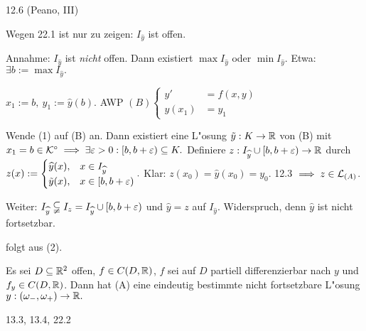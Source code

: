 \documentclass[a4paper,twoside,DIV15,BCOR12mm]{scrbook}
\begin{document}
\begin{beweis}
\begin{liste}
\item 12.6 (Peano, III)
\item Wegen 22.1 ist nur zu zeigen: $I_{\widehat{y}}$ ist offen.

Annahme: $I_{\widehat{y}}$ ist \emph{nicht} offen. Dann existiert $\max I_{\widehat{y}}$ oder $\min I_{\widehat{y}}.$ Etwa: $\exists b:=\max I_{\widehat{y}}.$

$x_1:=b,\ y_1:=\widehat{y}(b).$ AWP $(B)\begin{cases}y' & = f(x,y)\\ y(x_1) & = y_1\end{cases}$

Wende (1) auf (B) an. Dann existiert eine L"osung $\tilde{y}:K\to\mathbb{R}$ von (B) mit $x_1 = b\in\mathcal{K}^\circ \implies \exists \varepsilon>0: [b,b+\varepsilon) \subseteq K.$ Definiere $z:I_{\widehat{y}} \cup [b,b+\varepsilon) \to \mathbb{R}$ durch $z(x):=\begin{cases} \widehat{y}(x), & x\in I_{\widehat{y}}\\ \tilde{y}(x), & x \in [b,b+\varepsilon) \end{cases}.$ Klar: $z(x_0) = \widehat{y}(x_0) = y_0.$ 12.3 $\implies z \in \mathcal{L}_{(A)}$.

Weiter: $I_{\widehat{y}} \subsetneqq I_z = I_{\widehat{y}}\cup[b,b+\varepsilon)$ und $\widehat{y} = z$ auf $I_{\widehat{y}}$. Widerspruch, denn $\widehat{y}$ ist nicht fortsetzbar.
\item folgt aus (2).
\end{liste}
\end{beweis}

\begin{folgerung}
Es sei $D\subseteq\mathbb{R}^2$ offen, $f \in C(D,\mathbb{R})$, $f$ sei auf $D$ partiell differenzierbar nach $y$ und $f_y\in C(D,\mathbb{R})$. Dann hat (A) eine eindeutig bestimmte nicht fortsetzbare L"osung $y:(\omega_-,\omega_+)\to\mathbb{R}.$
\end{folgerung}

\begin{beweis}
13.3, 13.4, 22.2
\end{beweis}
\end{document}
